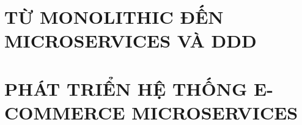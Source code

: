 \documentclass[a4paper,13pt,3p,twoside]{report}
\renewcommand{\headrulewidth}{0pt}
\renewcommand{\footrulewidth}{0pt}}
\theoremstyle{definition}
\begin{document}


% 


\clearpage
{}
\setcounter{page}{1}
\pagestyle{fancy}
\fancyhf{}
\fancyhead[L]{\color{primary}\leftmark}
\fancyfoot[R]{\color{primary}\thepage}
\renewcommand{\headrulewidth}{0.4pt}
\renewcommand{\headrule}{\hbox to\headwidth{\color{primary}\leaders\hrule height \headrulewidth\hfill}}
\renewcommand{\footrulewidth}{0pt}

\chapter{TỪ MONOLITHIC ĐẾN MICROSERVICES VÀ DDD}
\label{chapter:Introduction}

\newpage
\chapter{PHÁT TRIỂN HỆ THỐNG E-COMMERCE MICROSERVICES}
\label{chapter:Related_works}


\newpage
\end{document}
